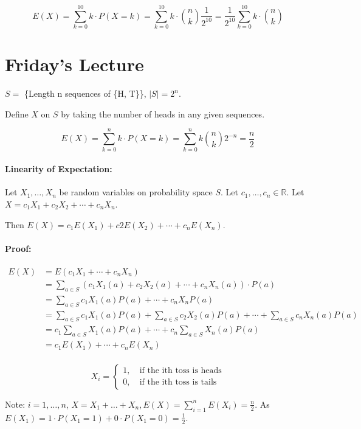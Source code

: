 \documentclass[a4paper, 11pt, twoside]{article}
\begin{document}
\[E(X)=\sum^{10}_{k=0}k\cdot P(X=k)=\sum^{10}_{k=0}k\cdot{n\choose k}\frac1{2^{10}}=\frac1{2^{10}}\sum^{10}_{k=0}k\cdot{n\choose k}\]

\section{Friday's Lecture}
$S =$ \{Length n sequences of \{H, T\}\}, $|S|=2^n$.

Define $X$ on $S$ by taking the number of heads in any given sequences.

\[E(X)=\sum^n_{k=0}k\cdot P(X=k)=\sum^n_{k=0}k {n\choose k} 2^{-n}=\frac{n}{2}\]

\paragraph{Linearity of Expectation:} Let $X_1,\dots, X_n$ be random variables on probability space $S$. Let $c_1,\dots, c_n\in\mathbb{R}$. Let $X=c_1X_1+c_2X_2+\cdots + c_nX_n$.

Then $E(X)=c_1E(X_1)+c2E(X_2)+\cdots+c_nE(X_n)$.

\paragraph{Proof:}

\[
\begin{split}
	E(X)&=E(c_1X_1+\cdots +c_nX_n)\\
	&=\sum_{a\in S} \left(c_1X_1(a)+c_2X_2(a)+\cdots +c_nX_n(a)\right)\cdot P(a)\\
	&=\sum_{a\in S} c_1X_1(a)P(a)+\cdots +c_nX_nP(a)\\
	&=\sum_{a\in S} c_1X_1(a)P(a)+\sum_{a\in S}c_2X_2(a)P(a)+\cdots +\sum_{a\in S}c_nX_n(a)P(a)\\
	&=c_1\sum_{a\in S}X_1(a)P(a)+\cdots +c_n\sum_{a\in S}X_n(a)P(a)\\
	&=c_1E(X_1)+\cdots +c_nE(X_n)
\end{split}
\]\\

\[X_i=\begin{cases}1,\ &\text{if the ith toss is heads}\\ 0,\ &\text{if the ith toss is tails}\end{cases}\]

Note: $i=1,\dots, n$, $X=X_1+\dots +X_n, E(X)=\sum^n_{i=1}E(X_i)=\frac{n}{2}.$ As $E(X_1)=1\cdot P(X_1=1)+0\cdot P(X_1=0)=\frac12$.\\
\end{document}
